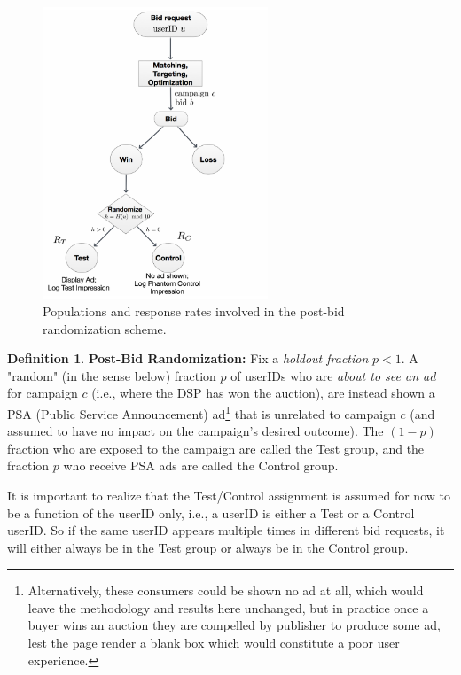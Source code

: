 \documentclass[11pt,a4paper]{article}
\theoremstyle{definition}
\newtheorem{definition}{Definition}[section]
\theoremstyle{remark}
\theoremstyle{definition}
\theoremstyle{definition}
\theoremstyle{definition}
\theoremstyle{definition}
\theoremstyle{definition}
\theoremstyle{definition}
\begin{document}
\begin{figure}\centering
\includegraphics[width = 0.6\textwidth]{post-bid-math.pdf}
\caption{Populations and response rates involved in the post-bid randomization scheme.}
\label{fig-post-bid}
\end{figure}

\begin{definition}
{\bf Post-Bid Randomization:} Fix a {\em holdout fraction} $p < 1$. 
A "random" (in the sense below) fraction $p$ of userIDs who are {\em about to see an ad} for campaign $c$ (i.e., where the DSP has won the auction), are instead shown a PSA (Public Service Announcement) ad\footnote{Alternatively, these consumers could be shown no ad at all, which would leave the methodology and results here unchanged, but in practice once a buyer wins an auction they are compelled by publisher to produce some ad, lest the page render a blank box which would constitute a poor user experience.} that is unrelated to campaign $c$ (and assumed to have no impact on the campaign's desired outcome). The $(1-p)$ fraction who are exposed to the campaign are called the Test group, and the fraction $p$ who receive PSA ads are called the Control group.
\end{definition}

It is important to realize that the Test/Control assignment is assumed for now to be a function of the userID only, i.e., a userID is either a Test or a Control userID. So if the same userID appears multiple times in different bid requests, it will either always be in the Test group or always be in the Control group. 
\end{document}
